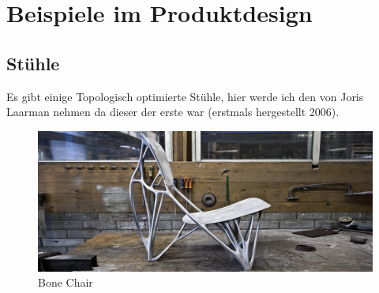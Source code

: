 \documentclass{article}
\begin{document}
\section{Beispiele im Produktdesign}

    \subsection{St\"uhle}
    Es gibt einige Topologisch optimierte St\"uhle, hier werde ich den von
    Joris Laarman \parencite{laarman2006} nehmen da dieser der erste war (erstmals 
    hergestellt 2006).
        \begin{figure}[H]
            \begin{minipage}{0.5\textwidth}
               \centering
               \vfill
               \includegraphics[width=\linewidth]{figures/beispiele/stals-2.jpg}
               \caption{Bone Chair \parencite{laarman2006}}
               \label{fig:stuhl-1}
            \end{minipage}
                \hfill
            \begin{minipage}{0.3\textwidth}
               \centering
               \vfill

\end{minipage}
\end{figure}
\end{document}
